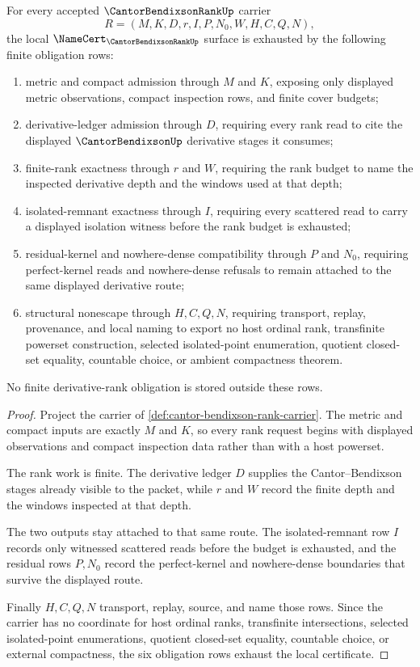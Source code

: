 \begin{theorem}
\label{thm:cantor-bendixson-rank-namecert-obligations}
For every accepted $\CantorBendixsonRankUp$ carrier
$$
R=(M,K,D,r,I,P,N_0,W,H,C,Q,N),
$$
the local $\NameCert_{\CantorBendixsonRankUp}$ surface is exhausted by the following finite obligation rows:
\begin{enumerate}
\item metric and compact admission through $M$ and $K$, exposing only displayed metric observations, compact inspection rows, and finite cover budgets;
\item derivative-ledger admission through $D$, requiring every rank read to cite the displayed $\CantorBendixsonUp$ derivative stages it consumes;
\item finite-rank exactness through $r$ and $W$, requiring the rank budget to name the inspected derivative depth and the windows used at that depth;
\item isolated-remnant exactness through $I$, requiring every scattered read to carry a displayed isolation witness before the rank budget is exhausted;
\item residual-kernel and nowhere-dense compatibility through $P$ and $N_0$, requiring perfect-kernel reads and nowhere-dense refusals to remain attached to the same displayed derivative route;
\item structural nonescape through $H,C,Q,N$, requiring transport, replay, provenance, and local naming to export no host ordinal rank, transfinite powerset construction, selected isolated-point enumeration, quotient closed-set equality, countable choice, or ambient compactness theorem.
\end{enumerate}
No finite derivative-rank obligation is stored outside these rows.
\end{theorem}
\begin{proof}
Project the carrier of \autoref{def:cantor-bendixson-rank-carrier}. The metric and compact inputs are exactly $M$ and $K$, so every rank request begins with displayed observations and compact inspection data rather than with a host powerset.

The rank work is finite. The derivative ledger $D$ supplies the Cantor--Bendixson stages already visible to the packet, while $r$ and $W$ record the finite depth and the windows inspected at that depth.

The two outputs stay attached to that same route. The isolated-remnant row $I$ records only witnessed scattered reads before the budget is exhausted, and the residual rows $P,N_0$ record the perfect-kernel and nowhere-dense boundaries that survive the displayed route.

Finally $H,C,Q,N$ transport, replay, source, and name those rows. Since the carrier has no coordinate for host ordinal ranks, transfinite intersections, selected isolated-point enumerations, quotient closed-set equality, countable choice, or external compactness, the six obligation rows exhaust the local certificate.
\end{proof}

